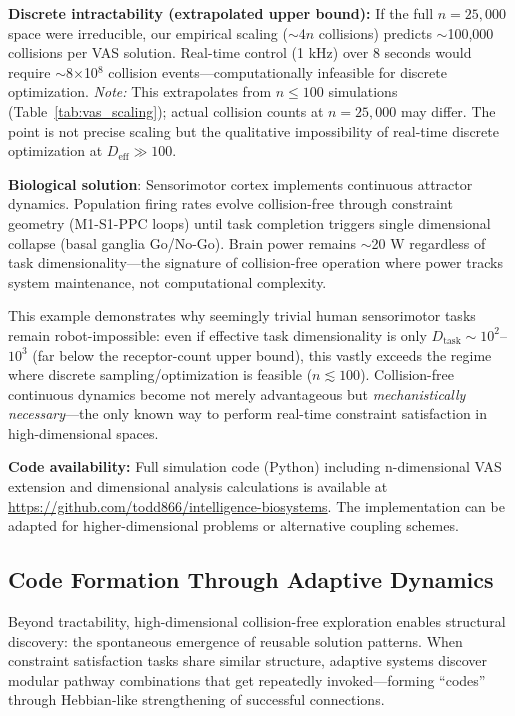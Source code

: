 \documentclass[12pt]{article}
\begin{document}
\textbf{Discrete intractability (extrapolated upper bound):} If the full $n=25,000$ space were irreducible, our empirical scaling ($\sim$4$n$ collisions) predicts $\sim$100,000 collisions per VAS solution. Real-time control (1 kHz) over 8 seconds would require $\sim$8$\times$10$^8$ collision events—computationally infeasible for discrete optimization. \textit{Note:} This extrapolates from $n \le 100$ simulations (Table~\ref{tab:vas_scaling}); actual collision counts at $n=25{,}000$ may differ. The point is not precise scaling but the qualitative impossibility of real-time discrete optimization at $D_{\text{eff}} \gg 100$.

\textbf{Biological solution}: Sensorimotor cortex implements continuous attractor dynamics. Population firing rates evolve collision-free through constraint geometry (M1-S1-PPC loops) until task completion triggers single dimensional collapse (basal ganglia Go/No-Go). Brain power remains $\sim$20 W regardless of task dimensionality—the signature of collision-free operation where power tracks system maintenance, not computational complexity.

This example demonstrates why seemingly trivial human sensorimotor tasks remain robot-impossible: even if effective task dimensionality is only $D_{\text{task}} \sim 10^2$--$10^3$ (far below the receptor-count upper bound), this vastly exceeds the regime where discrete sampling/optimization is feasible ($n \lesssim 100$). Collision-free continuous dynamics become not merely advantageous but \textit{mechanistically necessary}—the only known way to perform real-time constraint satisfaction in high-dimensional spaces.

\textbf{Code availability:} Full simulation code (Python) including n-dimensional VAS extension and dimensional analysis calculations is available at \url{https://github.com/todd866/intelligence-biosystems}. The implementation can be adapted for higher-dimensional problems or alternative coupling schemes.

\subsection{Code Formation Through Adaptive Dynamics}

Beyond tractability, high-dimensional collision-free exploration enables structural discovery: the spontaneous emergence of reusable solution patterns. When constraint satisfaction tasks share similar structure, adaptive systems discover modular pathway combinations that get repeatedly invoked—forming ``codes'' through Hebbian-like strengthening of successful connections.
\end{document}
